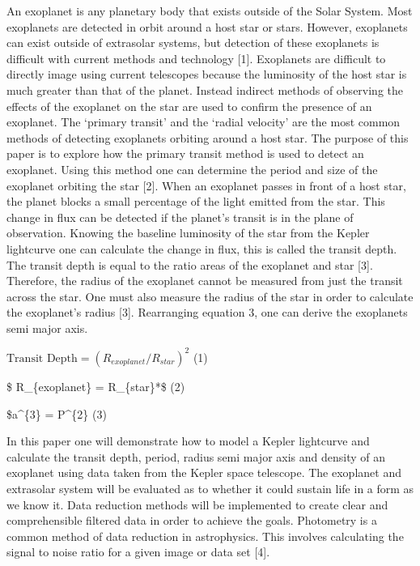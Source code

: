 \documentclass[11pt]{article}
\begin{document}
An exoplanet is any planetary body that exists outside of the Solar
System. Most exoplanets are detected in orbit around a host star or
stars. However, exoplanets can exist outside of extrasolar systems, but
detection of these exoplanets is difficult with current methods and
technology {[}1{]}. Exoplanets are difficult to directly image using
current telescopes because the luminosity of the host star is much
greater than that of the planet. Instead indirect methods of observing
the effects of the exoplanet on the star are used to confirm the
presence of an exoplanet. The `primary transit' and the `radial
velocity' are the most common methods of detecting exoplanets orbiting
around a host star. The purpose of this paper is to explore how the
primary transit method is used to detect an exoplanet. Using this method
one can determine the period and size of the exoplanet orbiting the star
{[}2{]}. When an exoplanet passes in front of a host star, the planet
blocks a small percentage of the light emitted from the star. This
change in flux can be detected if the planet's transit is in the plane
of observation. Knowing the baseline luminosity of the star from the
Kepler lightcurve one can calculate the change in flux, this is called
the transit depth. The transit depth is equal to the ratio areas of the
exoplanet and star {[}3{]}. Therefore, the radius of the exoplanet
cannot be measured from just the transit across the star. One must also
measure the radius of the star in order to calculate the exoplanet's
radius {[}3{]}. Rearranging equation 3, one can derive the exoplanets
semi major axis.

\(\text{Transit Depth} = (R_{exoplanet}/R_{star})^{2}\) (1)

\$ R\_\{exoplanet\} = R\_\{star\}*\$ (2)

\$a\^{}\{3\} =  P\^{}\{2\} (3)

In this paper one will demonstrate how to model a Kepler lightcurve and
calculate the transit depth, period, radius semi major axis and density
of an exoplanet using data taken from the Kepler space telescope. The
exoplanet and extrasolar system will be evaluated as to whether it could
sustain life in a form as we know it. Data reduction methods will be
implemented to create clear and comprehensible filtered data in order to
achieve the goals. Photometry is a common method of data reduction in
astrophysics. This involves calculating the signal to noise ratio for a
given image or data set {[}4{]}.
\end{document}
